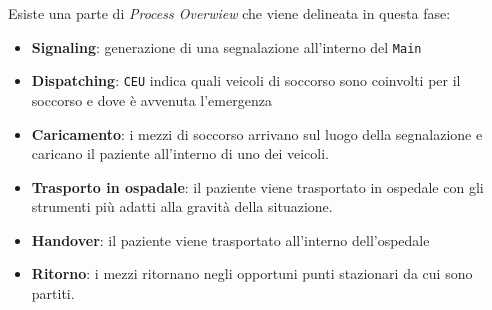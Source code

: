 \documentclass[12pt,a4paper,oneside]{article}
\begin{document}
Esiste una parte di \textit{Process Overwiew} che viene delineata in questa fase:
\begin{itemize}
    \item \textbf{Signaling}: generazione di una segnalazione all'interno del \texttt{Main}
    \item \textbf{Dispatching}: \texttt{CEU} indica quali veicoli di soccorso sono coinvolti per il soccorso e dove è avvenuta l'emergenza
    \item \textbf{Caricamento}: i mezzi di soccorso arrivano sul luogo della segnalazione e caricano il paziente all'interno di uno dei veicoli.
    \item \textbf{Trasporto in ospadale}: il paziente viene trasportato in ospedale con gli strumenti più adatti alla gravità della situazione.
    \item \textbf{Handover}: il paziente viene trasportato all'interno dell'ospedale
    \item \textbf{Ritorno}: i mezzi ritornano negli opportuni punti stazionari da cui sono partiti.
\end{itemize}
\end{document}
